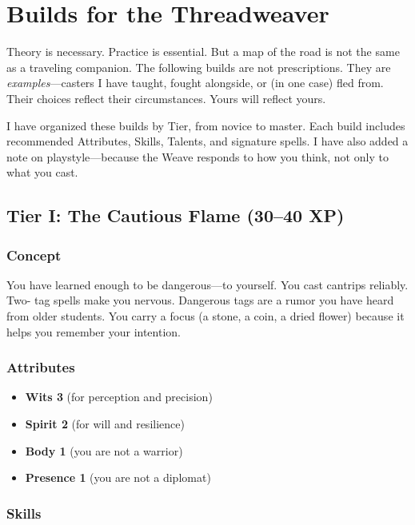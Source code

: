 \chapter{Builds for the Threadweaver}

Theory is necessary. Practice is essential. But a map of the road is not the same as a traveling companion. The following builds are not prescriptions. They are \emph{examples}---casters I have taught, fought alongside, or (in one case) fled from. Their choices reflect their circumstances. Yours will reflect yours.

I have organized these builds by Tier, from novice to master. Each build includes recommended Attributes, Skills, Talents, and signature spells. I have also added a note on playstyle---because the Weave responds to how you think, not only to what you cast.

\section{Tier I: The Cautious Flame (30--40 XP)}

\subsection{Concept}

You have learned enough to be dangerous---to yourself. You cast cantrips reliably. Two- tag spells make you nervous. Dangerous tags are a rumor you have heard from older students. You carry a focus (a stone, a coin, a dried flower) because it helps you remember your intention.

\subsection{Attributes}

\begin{itemize}
    \item \textbf{Wits 3} (for perception and precision)
    \item \textbf{Spirit 2} (for will and resilience)
    \item \textbf{Body 1} (you are not a warrior)
    \item \textbf{Presence 1} (you are not a diplomat)
\end{itemize}

\subsection{Skills}

